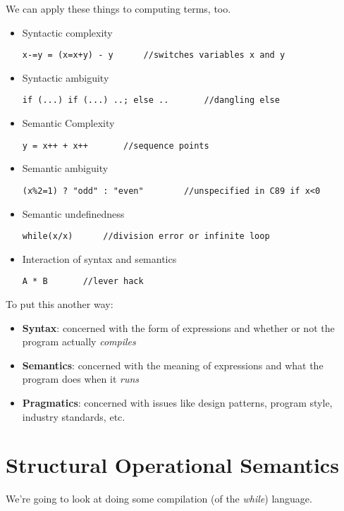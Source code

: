 \documentclass[11pt,a4paper,headsepline,titlepage,dvipsnames,cmyk]{scrartcl}
\begin{document}
We can apply these things to computing terms, too.
\begin{itemize}
    \item Syntactic complexity
            \begin{lstlisting}
x-=y = (x=x+y) - y      //switches variables x and y
            \end{lstlisting}
    \item Syntactic ambiguity
\begin{lstlisting}
if (...) if (...) ..; else ..       //dangling else
\end{lstlisting}
        \item Semantic Complexity
\begin{lstlisting}
y = x++ + x++       //sequence points
\end{lstlisting}
        \item Semantic ambiguity
\begin{lstlisting}
(x%2=1) ? "odd" : "even"        //unspecified in C89 if x<0
\end{lstlisting}
            \item Semantic undefinedness
\begin{lstlisting}
while(x/x)      //division error or infinite loop
\end{lstlisting}
            \item Interaction of syntax and semantics
\begin{lstlisting}
A * B       //lever hack
\end{lstlisting}

\end{itemize}

To put this another way:
\begin{itemize}
    \item \textbf{Syntax}: concerned with the form of expressions and
        whether or not the program actually \textit{compiles}
    \item \textbf{Semantics}: concerned with the meaning of expressions
        and what the program does when it \textit{runs}
    \item \textbf{Pragmatics}: concerned with issues like design patterns,
        program style, industry standards, etc.
\end{itemize}

\section{Structural Operational Semantics}%
\label{sec:struct-op-semantics}
We're going to look at doing some compilation (of the \textit{while})
language.
\end{document}
